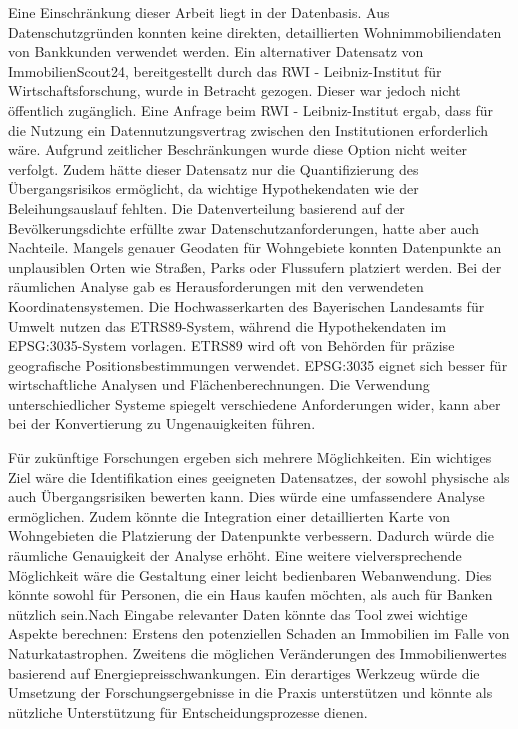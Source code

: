 Eine Einschränkung dieser Arbeit liegt in der Datenbasis. Aus Datenschutzgründen konnten keine direkten, detaillierten Wohnimmobiliendaten von Bankkunden verwendet werden. Ein alternativer Datensatz von ImmobilienScout24, bereitgestellt durch das RWI - Leibniz-Institut für Wirtschaftsforschung, wurde in Betracht gezogen. Dieser war jedoch nicht öffentlich zugänglich. Eine Anfrage beim RWI - Leibniz-Institut ergab, dass für die Nutzung ein Datennutzungsvertrag zwischen den Institutionen erforderlich wäre. Aufgrund zeitlicher Beschränkungen wurde diese Option nicht weiter verfolgt.
Zudem hätte dieser Datensatz nur die Quantifizierung des Übergangsrisikos ermöglicht, da wichtige Hypothekendaten wie der Beleihungsauslauf fehlten. Die Datenverteilung basierend auf der Bevölkerungsdichte erfüllte zwar Datenschutzanforderungen, hatte aber auch Nachteile. Mangels genauer Geodaten für Wohngebiete konnten Datenpunkte an unplausiblen Orten wie Straßen, Parks oder Flussufern platziert werden.
Bei der räumlichen Analyse gab es Herausforderungen mit den verwendeten Koordinatensystemen. Die Hochwasserkarten des Bayerischen Landesamts für Umwelt nutzen das ETRS89-System, während die Hypothekendaten im EPSG:3035-System vorlagen. ETRS89 wird oft von Behörden für präzise geografische Positionsbestimmungen verwendet. EPSG:3035 eignet sich besser für wirtschaftliche Analysen und Flächenberechnungen. Die Verwendung unterschiedlicher Systeme spiegelt verschiedene Anforderungen wider, kann aber bei der Konvertierung zu Ungenauigkeiten führen.

Für zukünftige Forschungen ergeben sich mehrere Möglichkeiten. Ein wichtiges Ziel wäre die Identifikation eines geeigneten Datensatzes, der sowohl physische als auch Übergangsrisiken bewerten kann. Dies würde eine umfassendere Analyse ermöglichen. Zudem könnte die Integration einer detaillierten Karte von Wohngebieten die Platzierung der Datenpunkte verbessern. Dadurch würde die räumliche Genauigkeit der Analyse erhöht. Eine weitere vielversprechende Möglichkeit wäre die Gestaltung einer leicht bedienbaren Webanwendung. Dies könnte sowohl für Personen, die ein Haus kaufen möchten, als auch für Banken nützlich sein.Nach Eingabe relevanter Daten könnte das Tool zwei wichtige Aspekte berechnen: Erstens den potenziellen Schaden an Immobilien im Falle von Naturkatastrophen. Zweitens die möglichen Veränderungen des Immobilienwertes basierend auf Energiepreisschwankungen. Ein derartiges Werkzeug würde die Umsetzung der Forschungsergebnisse in die Praxis unterstützen und könnte als nützliche Unterstützung für Entscheidungsprozesse dienen.
